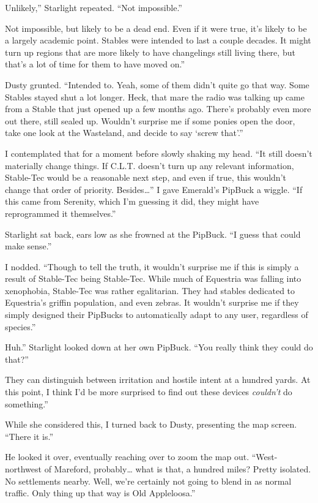 \leavevmode{}Unlikely,” Starlight repeated. “Not impossible.”

\leavevmode{}Not impossible, but likely to be a dead end. Even if it were true, it’s likely to be a largely academic point. Stables were intended to last a couple decades. It might turn up regions that are more likely to have changelings still living there, but that’s a lot of time for them to have moved on.”

Dusty grunted. “Intended to. Yeah, some of them didn’t quite go that way. Some Stables stayed shut a lot longer. Heck, that mare the radio was talking up came from a Stable that just opened up a few months ago. There’s probably even more out there, still sealed up. Wouldn’t surprise me if some ponies open the door, take one look at the Wasteland, and decide to say ‘screw that’.”

I contemplated that for a moment before slowly shaking my head. “It still doesn’t materially change things. If C.L.T. doesn’t turn up any relevant information, Stable-Tec would be a reasonable next step, and even if true, this wouldn’t change that order of priority. Besides…” I gave Emerald’s PipBuck a wiggle. “If this came from Serenity, which I’m guessing it did, they might have reprogrammed it themselves.”

Starlight sat back, ears low as she frowned at the PipBuck. “I guess that could make sense.”

I nodded. “Though to tell the truth, it wouldn’t surprise me if this is simply a result of Stable-Tec being Stable-Tec. While much of Equestria was falling into xenophobia, Stable-Tec was rather egalitarian. They had stables dedicated to Equestria’s griffin population, and even zebras. It wouldn’t surprise me if they simply designed their PipBucks to automatically adapt to any user, regardless of species.”

\leavevmode{}Huh.” Starlight looked down at her own PipBuck. “You really think they could do that?”

\leavevmode{}They can distinguish between irritation and hostile intent at a hundred yards. At this point, I think I’d be more surprised to find out these devices \textit{couldn’t} do something.”

While she considered this, I turned back to Dusty, presenting the map screen. “There it is.”

He looked it over, eventually reaching over to zoom the map out. “West-northwest of Mareford, probably… what is that, a hundred miles? Pretty isolated. No settlements nearby. Well, we’re certainly not going to blend in as normal traffic. Only thing up that way is Old Appleloosa.”

